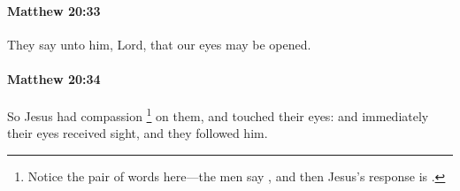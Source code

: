 		\paragraph{Matthew 20:33} %
			\label{MATTHEW-20-33}

			They say unto him, Lord, that our eyes may be opened.

			\begin{framed}
			\scriptsize
				\begin{compactdesc}
					\item[SBLG] 
				\end{compactdesc}
			\end{framed}

		\paragraph{Matthew 20:34} %
			\label{MATTHEW-20-34}

			So Jesus had compassion%
				\footnote{%
					Notice the pair of words here---the men say , and then Jesus's response is .
					}
			on them, and touched their eyes: and immediately their eyes received sight, and they followed him.

